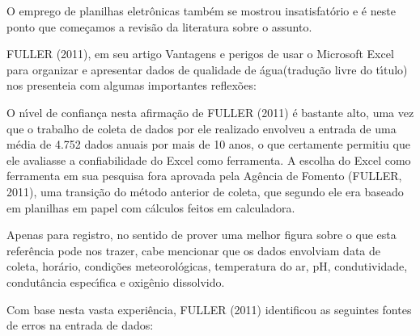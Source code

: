 \documentclass[
12pt,		%
openright,	%
twoside,  %
a4paper,			%
chapter=TITLE,		%
english,			%
french,				%
spanish,			%
brazil				%
]{USPSC-classe/USPSC}
\begin{document}
O emprego de planilhas eletr\^onicas tamb\'em se mostrou insatisfat\'orio e \'e neste ponto que come\c{c}amos a revis\~ao da literatura sobre o assunto.




FULLER (2011), em seu artigo \textquotedbl Vantagens e perigos de usar o Microsoft Excel para organizar e apresentar dados de qualidade de \'agua\textquotedbl  (tradu\c{c}\~ao livre do t\'{\i}tulo) nos presenteia com algumas importantes reflex\~oes:





\noindent\begin{center}\mbox{\centering{}}\end{center}


O n\'{\i}vel de confian\c{c}a nesta afirma\c{c}\~ao de  FULLER (2011) \'e bastante alto, uma vez que o trabalho de coleta de dados por ele realizado envolveu a entrada de uma m\'edia de 4.752 dados anuais por mais de 10 anos, o que certamente permitiu que ele avaliasse a confiabilidade do Excel como ferramenta. A escolha do Excel como ferramenta em sua pesquisa fora aprovada pela Ag\^encia de Fomento  (FULLER, 2011), uma transi\c{c}\~ao do m\'etodo anterior de coleta, que segundo ele era baseado em planilhas em papel com c\'alculos feitos em calculadora.




Apenas para registro, no sentido de prover uma melhor figura sobre o que esta refer\^encia pode nos trazer, cabe mencionar que os dados envolviam data de coleta, hor\'ario, condi\c{c}\~oes meteorol\'ogicas, temperatura do ar, pH, condutividade, condut\^ancia espec\'{\i}fica e oxig\^enio dissolvido.




Com base nesta vasta experi\^encia,  FULLER (2011) identificou as seguintes fontes de erros na entrada de dados:
\end{document}

